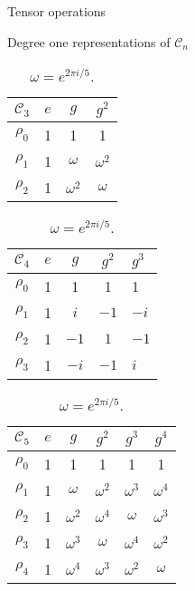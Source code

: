 \documentclass[handout,  12pt]{beamer}
\newcommand{\1}{\mathbf{1}}
\newcommand{\0}{\mathbf{0}}
\newcommand{\Cyc}{\mathcal{C}}%
\begin{document}
\begin{frame}{Tensor operations}
	\begin{frame}{Degree one representations of $\Cyc_n$}
		\begin{table}
			\parbox[s]{.45\linewidth}{
			\begin{table}
				\centering
				\begin{tabular}{c | c c c}
					$\Cyc_3$ & $e$ & $g$        & $g^2$      \\ \hline
					$\rho_0$          & 1   & 1          & 1          \\
					$\rho_1$          & 1   & $\omega$   & $\omega^2$ \\
					$\rho_2$          & 1   & $\omega^2$ & $\omega$
				\end{tabular} 
				\caption{$\omega = e^{2 \pi i/3}$.}
				\label{table:Cyc3}
				\begin{tabular}{c | c c cl}
					$\Cyc_4$ & $e$ & $g$  & $g^2$ & $g^3$ \\ \hline
					$\rho_0$           & 1   & 1    & 1     & 1     \\
					$\rho_1$           & 1   & $i$  & $-1$  & $-i$  \\
					$\rho_2$           & 1   & $-1$ & $1$  & $-1$   \\
					$\rho_3$           & 1   & $-i$ & $-1$   & $i$
				\end{tabular}
				\caption{$\omega = e^{\pi i/2}$.}
				\label{tbl:cyc4}
			\end{table}
			}
			\hfill
			\parbox[s]{.45\linewidth}{
				\begin{table}
					\centering
					\begin{tabular}{c | c c c c c}
						$\Cyc_5$ & $e$ & $g$        & $g^2$      & $g^3$      & $g^4$      \\ \hline
						$\rho_0$            & 1   & 1          & 1          & 1          & 1          \\
						$\rho_1$            & 1   & $\omega$ & $\omega^2$ & $\omega^3$ & $\omega^4$ \\
						$\rho_2$            & 1   & $\omega^2$ & $\omega^4$ & $\omega$ & $\omega^3$ \\
						$\rho_3$            & 1   & $\omega^3$ & $\omega$ & $\omega^4$ & $\omega^2$ \\
						$\rho_4$            & 1   & $\omega^4$ & $\omega^3$ & $\omega^2$ & $\omega$
					\end{tabular}
					\caption{$\omega = e^{2 \pi i/5}$.}
					\label{table:Cyc5}
				\end{table}
			}
		\end{table}
	\end{frame}
	

\end{frame}
\end{document}
